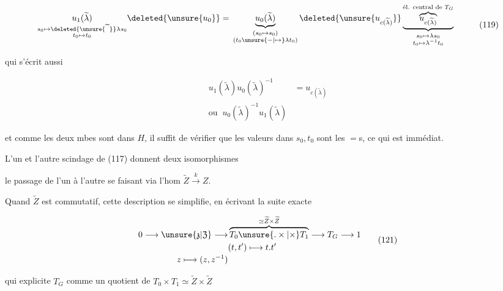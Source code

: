 \[\begin{aligned}
\underset{\substack{s_0\mapsto\deleted{\unsure{\widetilde{\phantom{\lambda}}}}\lambda s_0\\t_0\mapsto t_0}}{u_1(\widetilde\lambda)}\deleted{\unsure{u_0}}
={}&\underbrace{u_0(\widetilde\lambda)}_{\substack{(s_0\mapsto s_0)\\(t_0\unsure{-|\mapsto}\lambda t_0)}}
\deleted{\unsure{u_{c(\widetilde\lambda)}}}
\underbrace{\overbrace{u_{c(\widetilde\lambda)}}^{\text{él. central de }T_G}}_{\substack{s_0\mapsto\lambda s_0\\t_0\mapsto\lambda^{-1}t_0}}
\end{aligned}\tag*{(119)}\]

qui  s'écrit aussi

\[\begin{aligned}
u_1(\widetilde\lambda)u_0(\widetilde\lambda)^{-1}&=u_{c(\widetilde\lambda)}\\
\text{ou }\ u_0(\widetilde\lambda)^{-1}u_1(\widetilde\lambda)&
\end{aligned}\]

et comme les  deux mbes sont dans $H$, il suffit de vérifier que les valeurs dans $s_0,t_0$ sont les $=$s, ce qui est immédiat.

L'un et l'autre scindage de (117) donnent deux isomorphismes


le passage de l'un à l'autre se faisant via l'hom $\widetilde Z\xrightarrow{k}Z$.

Quand $\widetilde Z$ est commutatif,  cette description se simplifie, en écrivant la suite exacte

\[\begin{aligned}
0\longrightarrow\unsure{\mathfrak{z}|\mathfrak{Z}}\longrightarrow
&\overbrace{T_0\unsure{\mathbin{.}\times|\times}T_1}^{\simeq\widetilde Z\times\widetilde Z}\longrightarrow T_G\longrightarrow1\\
&(t,t')\longmapsto t.t'\\[-2pt]
z\longmapsto (z,z^{-1})&
\end{aligned}\tag*{(121)}\]

qui explicite $T_G$ comme un quotient de $T_0\times T_1\simeq\widetilde Z\times\widetilde Z$

